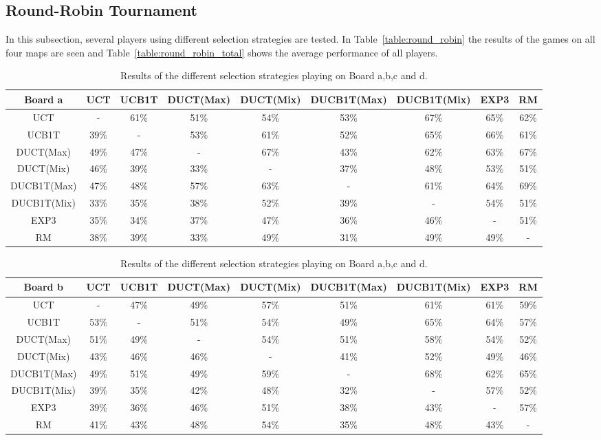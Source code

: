 \documentclass{article}
\begin{document}
\subsection{Round-Robin Tournament}
\label{subsec:round_robin}
In this subsection, several players using different selection strategies are tested. In Table~\ref{table:round_robin} the results of the games on all four maps are seen and Table~\ref{table:round_robin_total} shows the average performance of all players.

\begin{table}\scriptsize
\caption{Results of the different selection strategies playing on Board a,b,c and d.}
\centering
\begin{tabular}{|c||c|c|c|c|c|c|c|c|}
									\hline
  Board a 		& UCT 	& UCB1T		& DUCT(Max)	& DUCT(Mix)	& DUCB1T(Max)	& DUCB1T(Mix)	& EXP3	& RM				\\ 	\hline\hline
  UCT 			&  -	& 61\%		& 51\% 		& 54\%		& 53\%		& 67\%		& 65\%	& 62\%				\\ 	\hline
  UCB1T 		& 39\% 	& - 		& 53\%		& 61\%		& 52\%		& 65\%		& 66\%	& 61\%				\\ 	\hline
  DUCT(Max) 		& 49\% 	& 47\%		& -		& 67\%		& 43\%		& 62\%		& 63\%	& 67\%				\\ 	\hline
  DUCT(Mix) 		& 46\% 	& 39\% 		& 33\%		& -		& 37\%		& 48\%		& 53\%	& 51\%				\\ 	\hline
  DUCB1T(Max)	 	& 47\% 	& 48\% 		& 57\%		& 63\%		& -		& 61\%		& 64\%	& 69\%				\\ 	\hline
  DUCB1T(Mix)	 	& 33\% 	& 35\% 		& 38\%		& 52\%		& 39\%		& -		& 54\%	& 51\%				\\ 	\hline
  EXP3 			& 35\% 	& 34\% 		& 37\%		& 47\%		& 36\%		& 46\%		& -	& 51\%				\\ 	\hline
  RM		 	& 38\%	& 39\% 		& 33\%		& 49\%		& 31\%		& 49\%		& 49\%	& -				\\ 	\hline
\end{tabular}

\begin{tabular}{|c||c|c|c|c|c|c|c|c|}
									\hline
  Board b 		& UCT 	& UCB1T		& DUCT(Max)	& DUCT(Mix)	& DUCB1T(Max)	& DUCB1T(Mix)	& EXP3	& RM				\\ 	\hline\hline
  UCT 			&  -	& 47\%		& 49\%		& 57\%		& 51\%		& 61\%		& 61\%	& 59\%				\\ 	\hline
  UCB1T 		& 53\% 	& - 		& 51\%		& 54\%		& 49\%		& 65\%		& 64\%	& 57\%				\\ 	\hline
  DUCT(Max) 		& 51\% 	& 49\% 		& -		& 54\%		& 51\%		& 58\%		& 54\%	& 52\%				\\ 	\hline
  DUCT(Mix) 		& 43\%	& 46\% 		& 46\%		& -		& 41\%		& 52\%		& 49\%	& 46\%				\\ 	\hline
  DUCB1T(Max)	 	& 49\% 	& 51\% 		& 49\%		& 59\%		& -		& 68\%		& 62\%	& 65\%				\\ 	\hline
  DUCB1T(Mix)	 	& 39\% 	& 35\% 		& 42\%		& 48\%		& 32\%		& -		& 57\%	& 52\%				\\ 	\hline
  EXP3 			& 39\% 	& 36\% 		& 46\%		& 51\%		& 38\%		& 43\%		& -	& 57\%				\\ 	\hline
  RM 			& 41\% 	& 43\% 		& 48\%		& 54\%		& 35\%		& 48\%		& 43\%	& -				\\ 	\hline
\end{tabular}


\end{table}
\end{document}
